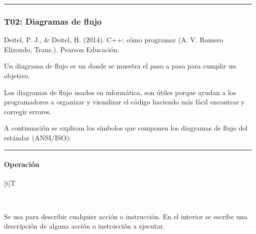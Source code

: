 \documentclass[letterpaper,10pt,spanish]{sphinxmanual}
\let\sphinxpxdimen\pdfpxdimen\else\newdimen\sphinxpxdimen
\begin{document}
\bigskip\hrule\bigskip


\sphinxstepscope


\subsubsection{T02: Diagramas de flujo}
\label{\detokenize{cursos/ofimatica11/recursos/T02:t02-diagramas-de-flujo}}\label{\detokenize{cursos/ofimatica11/recursos/T02::doc}}
\sphinxAtStartPar
%
\begin{footnote}[1]\sphinxAtStartFootnote
Deitel, P. J., \& Deitel, H. (2014). C++: cómo programar (A. V. Romero Elizondo, Trans.). Pearson Educación.
%
\end{footnote} Un diagrama de flujo es un  donde se muestra el paso a paso para cumplir un objetivo.

\sphinxAtStartPar
Los diagramas de flujo usados en informática, son útiles porque ayudan a los programadores a organizar y visualizar el código haciendo más fácil encontrar y corregir errores.

\sphinxAtStartPar
A continuación se explican los símbolos que componen los diagramas de flujo del estándar (ANSI/ISO):


\bigskip\hrule\bigskip



\paragraph{Operación}
\label{\detokenize{cursos/ofimatica11/recursos/T02:operacion}}

\begin{savenotes}\sphinxattablestart
\sphinxthistablewithglobalstyle
\centering
\begin{tabulary}{\linewidth}[t]{T}
\sphinxtoprule
\sphinxtableatstartofbodyhook

\begin{sphinxfigure-in-table}
\centering
\capstart
\noindent\sphinxincludegraphics[width=250\sphinxpxdimen]{{image016}.png}
\label{\detokenize{cursos/ofimatica11/recursos/T02:id3}}\end{sphinxfigure-in-table}\relax
\\
\sphinxbottomrule
\end{tabulary}
\sphinxtableafterendhook\par
\sphinxattableend\end{savenotes}

\sphinxAtStartPar
Se usa para describir cualquier acción o instrucción. En el interior se escribe una descripción de alguna acción o instrucción a ejecutar.
\end{document}
